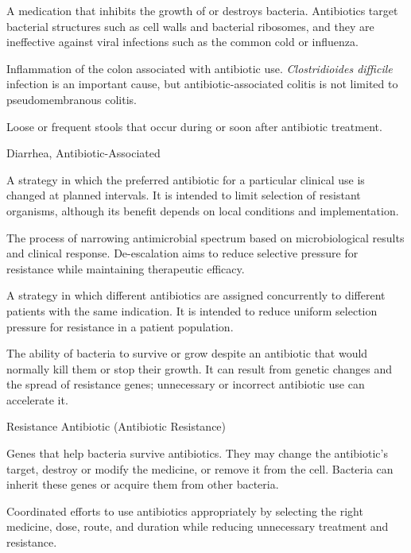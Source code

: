  A medication that inhibits the growth of or destroys bacteria. Antibiotics target bacterial structures such as cell walls and bacterial ribosomes, and they are ineffective against viral infections such as the common cold or influenza.

 Inflammation of the colon associated with antibiotic use. \textit{Clostridioides difficile} infection is an important cause, but antibiotic-associated colitis is not limited to pseudomembranous colitis.

 Loose or frequent stools that occur during or soon after antibiotic treatment.

\synonyms
Diarrhea, Antibiotic-Associated

 A strategy in which the preferred antibiotic for a particular clinical use is changed at
planned intervals. It is intended to limit selection of resistant organisms, although its
benefit depends on local conditions and implementation.

 The process of narrowing antimicrobial spectrum based on microbiological results and
clinical response. De-escalation aims to reduce selective pressure for resistance while
maintaining therapeutic efficacy.

 A strategy in which different antibiotics are assigned concurrently to different patients
with the same indication. It is intended to reduce uniform selection pressure for
resistance in a patient population.

 The ability of bacteria to survive or grow despite an antibiotic that would normally kill them or stop their growth. It can result from genetic changes and the spread of resistance genes; unnecessary or incorrect antibiotic use can accelerate it.

\synonyms
Resistance Antibiotic (Antibiotic Resistance)

 Genes that help bacteria survive antibiotics. They may change the antibiotic’s target, destroy or modify the medicine, or remove it from the cell. Bacteria can inherit these genes or acquire them from other bacteria.

 Coordinated efforts to use antibiotics appropriately by selecting the right medicine, dose, route, and duration while reducing unnecessary treatment and resistance.

